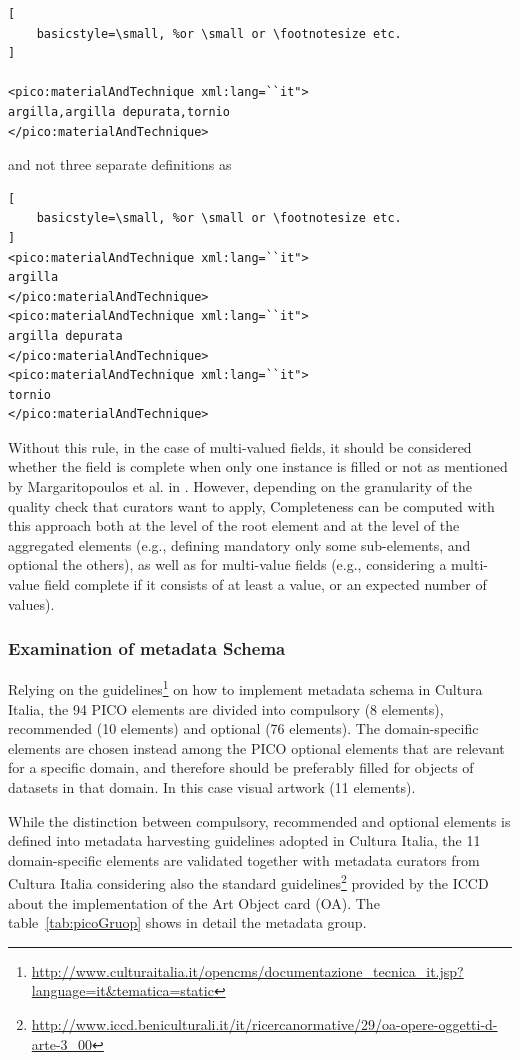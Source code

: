 \documentclass[epsfig,a4paper,12pt,titlepage]{book}
\begin{document}
\begin{lstlisting}[
    basicstyle=\small, %or \small or \footnotesize etc.
]
   
<pico:materialAndTechnique xml:lang=``it">
argilla,argilla depurata,tornio
</pico:materialAndTechnique>
\end{lstlisting}
and not three separate definitions as 
\begin{lstlisting}[
    basicstyle=\small, %or \small or \footnotesize etc.
]
<pico:materialAndTechnique xml:lang=``it">
argilla
</pico:materialAndTechnique>
<pico:materialAndTechnique xml:lang=``it">
argilla depurata
</pico:materialAndTechnique>
<pico:materialAndTechnique xml:lang=``it">
tornio
</pico:materialAndTechnique>
\end{lstlisting}

Without this rule, in the case of multi-valued fields, it should be considered whether the field is complete when only one instance is filled or not as mentioned by Margaritopoulos et al. in \cite{margaritopoulos2009fine}. However, depending on the granularity of the quality check that curators want to apply, Completeness can be computed with this approach both at the level of the root element and at the level of the aggregated elements (e.g., defining mandatory only some sub-elements, and optional the others), as well as for multi-value fields (e.g., considering a multi-value field complete if it consists of at least a value, or an expected number of values).


\subsubsection{Examination of metadata Schema}

Relying on the guidelines\footnote{\url{http://www.culturaitalia.it/opencms/documentazione_tecnica_it.jsp?language=it&tematica=static}} on how to implement metadata schema in Cultura Italia, the 94 PICO elements are divided into compulsory (8 elements), recommended (10 elements) and optional (76 elements). The domain-specific elements are chosen instead among the PICO optional elements that are relevant for a specific domain, and therefore should be preferably filled for objects of datasets in that domain. In this case visual artwork (11 elements). 

While the distinction between compulsory, recommended and optional elements is defined into metadata harvesting guidelines adopted in Cultura Italia, the 11 domain-specific elements are validated together with metadata curators from Cultura Italia considering also the standard guidelines\footnote{\url{http://www.iccd.beniculturali.it/it/ricercanormative/29/oa-opere-oggetti-d-arte-3_00}} provided by the ICCD about the implementation of the Art Object card (OA).
The table~\ref{tab:picoGruop} shows in detail the metadata group.
\end{document}
